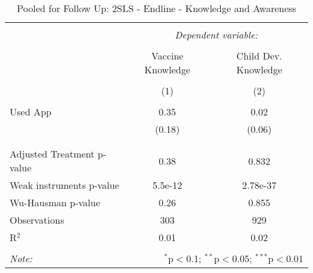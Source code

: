 
\begin{table}[!htbp] \centering 
  \caption{Pooled for Follow Up: 2SLS - Endline - Knowledge and Awareness} 
  \label{tbl:Pooled for Follow Up: 2SLS - Endline - Knowledge and Awareness} 
\begin{tabular}{@{\extracolsep{5pt}}lcc} 
\\[-1.8ex]\hline 
\hline \\[-1.8ex] 
 & \multicolumn{2}{c}{\textit{Dependent variable:}} \\ 
\cline{2-3} 
\\[-1.8ex] & Vaccine Knowledge & Child Dev. Knowledge \\ 
\\[-1.8ex] & (1) & (2)\\ 
\hline \\[-1.8ex] 
 Used App & 0.35 & 0.02 \\ 
  & (0.18) & (0.06) \\ 
  & & \\ 
\hline \\[-1.8ex] 
Adjusted Treatment p-value & 0.38 & 0.832 \\ 
Weak instruments p-value & 5.5e-12 & 2.78e-37 \\ 
Wu-Hausman p-value & 0.26 & 0.855 \\ 
Observations & 303 & 929 \\ 
R$^{2}$ & 0.01 & 0.02 \\ 
\hline 
\hline \\[-1.8ex] 
\textit{Note:}  & \multicolumn{2}{r}{$^{*}$p$<$0.1; $^{**}$p$<$0.05; $^{***}$p$<$0.01} \\ 
\end{tabular} 
\end{table} 
